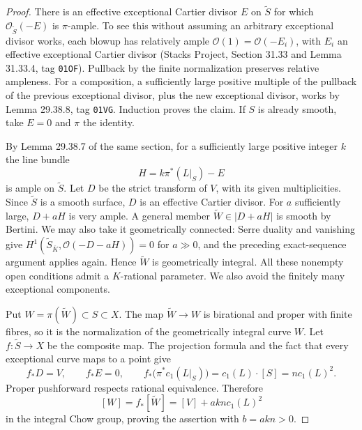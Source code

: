 \begin{proof}
There is an effective exceptional Cartier divisor $E$ on
$\widetilde S$ for which $\mathcal O_{\widetilde S}(-E)$ is
$\pi$-ample.  To see this without assuming an arbitrary exceptional
divisor works, each blowup has relatively ample
$\mathcal O(1)=\mathcal O(-E_i)$, with $E_i$ an effective exceptional
Cartier divisor (Stacks Project, Section 31.33 and Lemma 31.33.4, tag
\texttt{01OF}).  Pullback by the finite normalization preserves
relative ampleness.  For a composition, a sufficiently large positive
multiple of the pullback of the previous exceptional divisor, plus
the new exceptional divisor, works by Lemma 29.38.8, tag
\texttt{01VG}.  Induction proves the claim.  If $S$ is already smooth,
take $E=0$ and $\pi$ the identity.

By Lemma 29.38.7 of the same section, for a sufficiently large positive
integer $k$ the line bundle
\[
 H=k\pi^*(L|_S)-E
\]
is ample on $\widetilde S$.  Let $D$ be the strict transform of $V$,
with its given multiplicities.  Since $\widetilde S$ is a smooth
surface, $D$ is an effective Cartier divisor.  For $a$ sufficiently
large, $D+aH$ is very ample.  A general member
$\widetilde W\in|D+aH|$ is smooth by Bertini.  We may also take it
geometrically connected: Serre duality and vanishing give
$H^1(\widetilde S_{\overline K},\mathcal O(-D-aH))=0$ for $a\gg0$,
and the preceding exact-sequence argument applies again.  Hence
$\widetilde W$ is geometrically integral.  All these nonempty open
conditions admit a $K$-rational parameter.  We also avoid the finitely
many exceptional components.

Put $W=\pi(\widetilde W)\subset S\subset X$.  The map
$\widetilde W\to W$ is birational and proper with finite fibres, so it
is the normalization of the geometrically integral curve $W$.  Let
$f:\widetilde S\to X$ be the composite map.  The projection formula
and the fact that every exceptional curve maps to a point give
\[
 f_*D=V,\qquad f_*E=0,\qquad
 f_*\bigl(\pi^*c_1(L|_S)\bigr)=c_1(L)\cdot[S]
 =n c_1(L)^2.
\]
Proper pushforward respects rational equivalence.  Therefore
\[
 [W]=f_*[\widetilde W]=[V]+ak n c_1(L)^2
\]
in the integral Chow group, proving the assertion with $b=akn>0$.


\end{proof}
